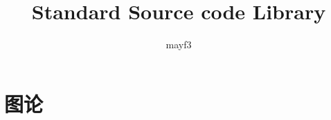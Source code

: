 \documentclass[12pt,a4paper,titlepage]{article}
\author{mayf3}
\title{Standard Source code Library}
\begin{document}

\maketitle
\tableofcontents

\newpage
\section{\LARGE 图论}
%	
%	
%
%	
%	
%	
%	
%
%	
%	
%	
%	
%	
%	
%    
%	
%	
%
%    
%	
%    
%	
%
\end{document}
